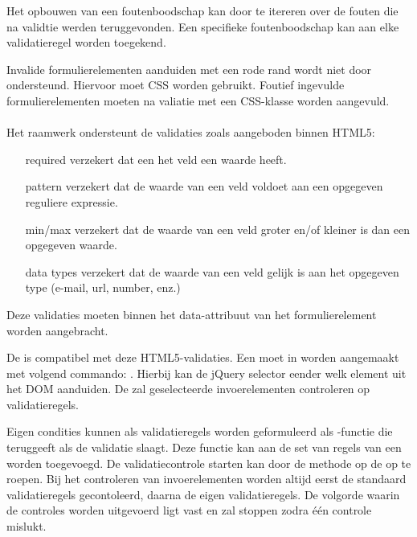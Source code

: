 Het opbouwen van een foutenboodschap kan door te itereren over de fouten die na validtie werden teruggevonden.
Een specifieke foutenboodschap kan aan elke validatieregel worden toegekend.

Invalide formulierelementen aanduiden met een rode rand wordt niet door \st{} ondersteund.
Hiervoor moet CSS worden gebruikt.
Foutief ingevulde formulierelementen moeten na valiatie met een CSS-klasse worden aangevuld.

\paragraph{\kendo}
Het \kendo{} raamwerk ondersteunt de validaties zoals aangeboden binnen HTML5:
\begin{itemize}
  \item [required] verzekert dat een het veld een waarde heeft.
  \item [pattern] verzekert dat de waarde van een veld voldoet aan een opgegeven reguliere expressie.
  \item [min/max] verzekert dat de waarde van een veld groter en/of kleiner is dan een opgegeven waarde.
  \item [data types] verzekert dat de waarde van een veld gelijk is aan het opgegeven type (e-mail, url, number, enz.)
\end{itemize}
Deze validaties moeten binnen het data-attribuut van het formulierelement worden aangebracht.

De \kendo{}  is compatibel met deze HTML5-validaties.
Een  moet in \js worden aangemaakt met volgend commando:  .
Hierbij kan de jQuery selector eender welk element uit het DOM aanduiden.
De  zal geselecteerde invoerelementen controleren op validatieregels.

Eigen condities kunnen als validatieregels worden geformuleerd als \js-functie die  teruggeeft als de validatie slaagt.
Deze functie kan aan de set van regels van een  worden toegevoegd.
De validatiecontrole starten kan door de  methode op de  op te roepen.
Bij het controleren van invoerelementen worden altijd eerst de standaard validatieregels gecontoleerd,  daarna de eigen validatieregels.
De volgorde waarin de controles worden uitgevoerd ligt vast en zal stoppen zodra één controle mislukt.

